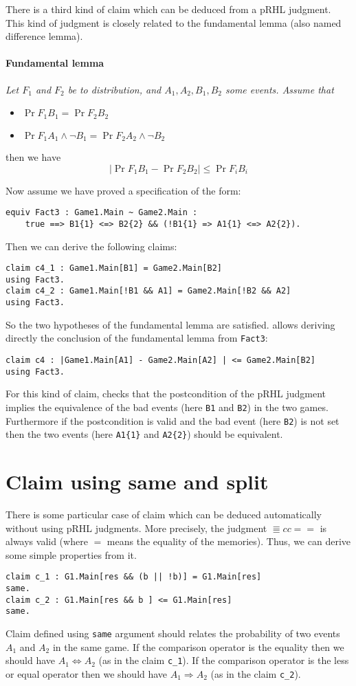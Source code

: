 There is a third kind of claim which can be deduced from a pRHL judgment.
This kind of judgment is closely related to the fundamental lemma 
(also named difference lemma).
\paragraph{Fundamental lemma}{\it Let $F_1$ and $F_2$ be to distribution,
 and $A_1, A_2, B_1, B_2$ some events. Assume that
 \begin{itemize}
    \item $\Pr{F_1}{B_1} = \Pr{F_2}{B_2} $
    \item $\Pr{F_1}{A_1 \land \neg B_1} = \Pr{F_2}{A_2 \land \neg B_2}$
 \end{itemize}
then we have 
  $$ | \Pr{F_1}{B_1} - \Pr{F_2}{B_2} | \leq \Pr{F_i}{B_i}$$}

Now assume we have proved a specification of the form:
\begin{verbatim}
equiv Fact3 : Game1.Main ~ Game2.Main : 
    true ==> B1{1} <=> B2{2} && (!B1{1} => A1{1} <=> A2{2}).
\end{verbatim}
Then we can derive the following claims:
\begin{verbatim}
claim c4_1 : Game1.Main[B1] = Game2.Main[B2]
using Fact3.
claim c4_2 : Game1.Main[!B1 && A1] = Game2.Main[!B2 && A2]
using Fact3.
\end{verbatim}
So the two hypotheses of the fundamental lemma are satisfied. 
\EasyCrypt allows deriving directly the conclusion of the fundamental
lemma from \verb+Fact3+:
\begin{verbatim}
claim c4 : |Game1.Main[A1] - Game2.Main[A2] | <= Game2.Main[B2] 
using Fact3.
\end{verbatim} 
For this kind of claim, \EasyCrypt checks that the postcondition of
the pRHL judgment implies the equivalence of the bad events 
(here \verb+B1+ and \verb+B2+) in the two games. 
Furthermore if the postcondition is valid and the bad event (here \verb+B2+) 
is not set then the two events 
(here \verb+A1{1}+ and \verb+A2{2}+) should be equivalent.



\section{Claim using same and split}

There is some particular case of claim which can be deduced 
automatically without using pRHL judgments.
More precisely, the judgment $\Equiv{c}{c}{=}{=}$ is always valid 
(where $=$ means the equality of the memories).
Thus, we can derive some simple properties from it.
\begin{verbatim}
claim c_1 : G1.Main[res && (b || !b)] = G1.Main[res] 
same.
claim c_2 : G1.Main[res && b ] <= G1.Main[res]
same.
\end{verbatim}
Claim defined using \verb+same+ argument should relates the probability
of two events $A_1$ and $A_2$ in the same game.
If the comparison operator is the equality then we should have 
$A_1 \Leftrightarrow A_2$ (as in the claim \verb+c_1+).
If the comparison operator is the less or equal operator 
then we should have $A_1 \Rightarrow A_2$ (as in the claim \verb+c_2+).

